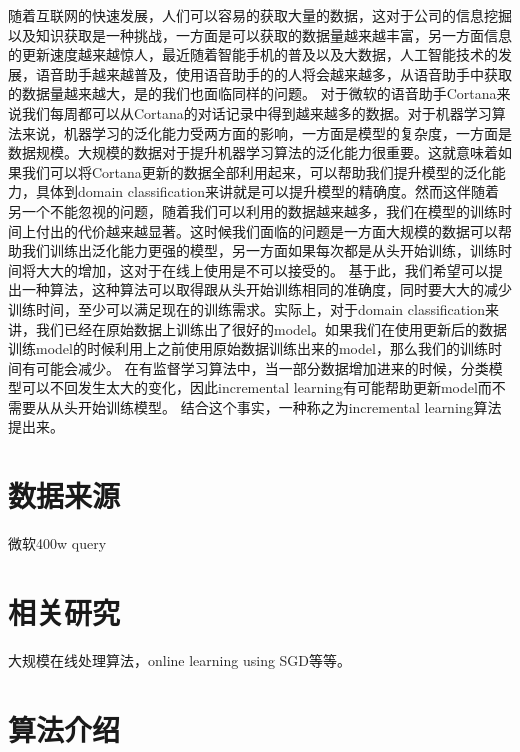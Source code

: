 \documentclass[master]{njuthesis}
\begin{document}
随着互联网的快速发展，人们可以容易的获取大量的数据，这对于公司的信息挖掘以及知识获取是一种挑战，一方面是可以获取的数据量越来越丰富，另一方面信息的更新速度越来越惊人，最近随着智能手机的普及以及大数据，人工智能技术的发展，语音助手越来越普及，使用语音助手的的人将会越来越多，从语音助手中获取的数据量越来越大，是的我们也面临同样的问题。
对于微软的语音助手Cortana来说我们每周都可以从Cortana的对话记录中得到越来越多的数据。对于机器学习算法来说，机器学习的泛化能力受两方面的影响，一方面是模型的复杂度，一方面是数据规模。大规模的数据对于提升机器学习算法的泛化能力很重要。这就意味着如果我们可以将Cortana更新的数据全部利用起来，可以帮助我们提升模型的泛化能力，具体到domain classification来讲就是可以提升模型的精确度。然而这伴随着另一个不能忽视的问题，随着我们可以利用的数据越来越多，我们在模型的训练时间上付出的代价越来越显著。这时候我们面临的问题是一方面大规模的数据可以帮助我们训练出泛化能力更强的模型，另一方面如果每次都是从头开始训练，训练时间将大大的增加，这对于在线上使用是不可以接受的。
基于此，我们希望可以提出一种算法，这种算法可以取得跟从头开始训练相同的准确度，同时要大大的减少训练时间，至少可以满足现在的训练需求。实际上，对于domain classification来讲，我们已经在原始数据上训练出了很好的model。如果我们在使用更新后的数据训练model的时候利用上之前使用原始数据训练出来的model，那么我们的训练时间有可能会减少。
在有监督学习算法中，当一部分数据增加进来的时候，分类模型可以不回发生太大的变化，因此incremental learning有可能帮助更新model而不需要从从头开始训练模型。
结合这个事实，一种称之为incremental learning算法提出来。

\section{数据来源}

微软400w query

\section{相关研究}

大规模在线处理算法，online learning using SGD等等。

\section{算法介绍}
\end{document}
